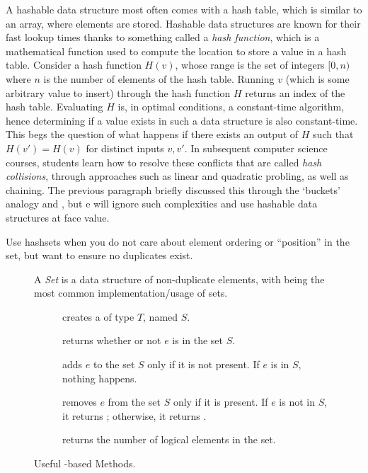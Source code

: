 A hashable data structure most often comes with a hash table, which is similar to an array, where elements are stored. Hashable data structures are known for their fast lookup times thanks to something called a \textit{hash function}, which is a mathematical function used to compute the location to store a value in a hash table. Consider a hash function $H(v)$, whose range is the set of integers $[0, n)$ where $n$ is the number of elements of the hash table. Running $v$ (which is some arbitrary value to insert) through the hash function $H$ returns an index of the hash table. Evaluating $H$ is, in optimal conditions, a constant-time algorithm, hence determining if a value exists in such a data structure is also constant-time. This begs the question of what happens if there exists an output of $H$ such that $H(v') = H(v)$ for distinct inputs $v, v'$. In subsequent computer science courses, students learn how to resolve these conflicts that are called \textit{hash collisions}, through approaches such as linear and quadratic probling, as well as chaining. The previous paragraph briefly discussed this through the `buckets' analogy and , but e will ignore such complexities and use hashable data structures at face value.  

Use hashsets when you do not care about element ordering or ``position'' in the set, but want to ensure no duplicates exist.
\begin{figure}[tp]
  \small
  \begin{tcolorbox}[title=Java Sets]
    A \textit{Set} is a data structure of non-duplicate elements, with  being the most common implementation/usage of sets.
    \vspace{2ex}
  \begin{description}
    \item [] creates a  of type $T$, named $S$.
     \item [] returns whether or not $e$ is in the set $S$.
     \item [] adds $e$ to the set $S$ only if it is not present. If $e$ is in $S$, nothing happens.
     \item [] removes $e$ from the set $S$ only if it is present. If $e$ is not in $S$, it returns ; otherwise, it returns .
    \item [] returns the number of logical elements in the set.
  \end{description}
\end{tcolorbox}
  \caption{Useful -based Methods.}
  \label{fig:hashsets}
\end{figure}

